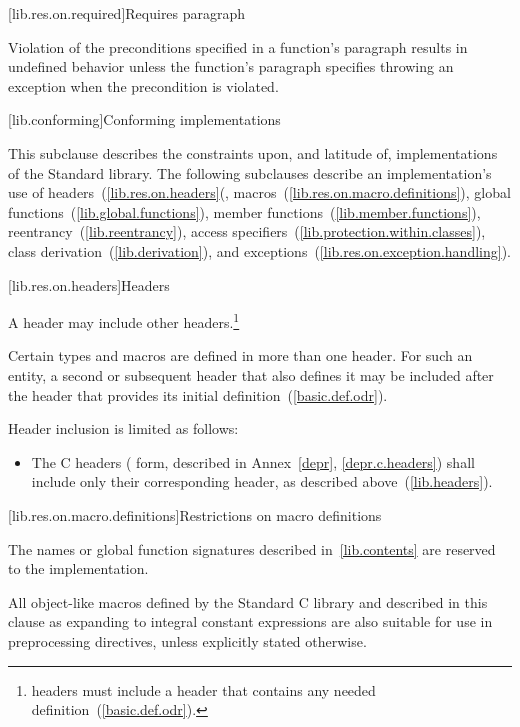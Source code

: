 [lib.res.on.required]{Requires paragraph}

\pnum
{}%
Violation of the preconditions specified in a function's
\required
paragraph results in undefined behavior unless the function's
\throws
paragraph specifies throwing an exception when the precondition is violated.

[lib.conforming]{Conforming implementations}

\pnum
This subclause describes the constraints upon, and latitude of, implementations of the \Cpp Standard library.
The following subclauses describe an implementation's use of headers~(\ref{lib.res.on.headers}(,
macros~(\ref{lib.res.on.macro.definitions}),
global functions~(\ref{lib.global.functions}),
member functions~(\ref{lib.member.functions}),
reentrancy~(\ref{lib.reentrancy}),
access specifiers~(\ref{lib.protection.within.classes}),
class derivation~(\ref{lib.derivation}),
and exceptions~(\ref{lib.res.on.exception.handling}).

[lib.res.on.headers]{Headers}

\pnum
A \Cpp header may include other \Cpp headers.\footnote{\Cpp headers must
include a \Cpp header that contains any needed definition~(\ref{basic.def.odr}).}

\pnum
Certain types and macros are defined in more than one header.
For such an entity, a second or subsequent header that also defines it may be
included after the header that provides its initial
definition~(\ref{basic.def.odr}).

\pnum
Header inclusion is limited as follows:

\begin{itemize}
\item
The C headers (  form, described in Annex~\ref{depr}, \ref{depr.c.headers})
shall include only their corresponding \Cpp header, as described above~(\ref{lib.headers}).
\end{itemize}

[lib.res.on.macro.definitions]{Restrictions on macro definitions}
%

\pnum
The names or global function signatures described in~\ref{lib.contents} are
%
reserved to the implementation.
%
%
%
%
%

\pnum
All object-like macros defined by the Standard C library and described in this
clause as expanding to integral constant expressions are also suitable for use
in  preprocessing directives, unless
explicitly stated otherwise.

